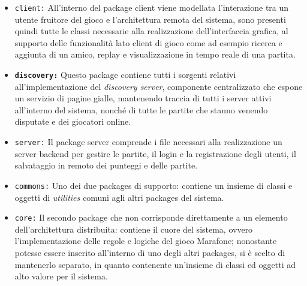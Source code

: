          \begin{itemize}
         \item{\texttt{client:}} All'interno del package client viene modellata l'interazione tra un utente fruitore del gioco e
         l'architettura remota del sistema, sono presenti quindi tutte le classi necessarie alla realizzazione dell'interfaccia grafica, al supporto delle funzionalità lato client di gioco come ad esempio ricerca e aggiunta di un amico, replay e visualizzazione in tempo reale di una partita.


         \item{\textbf{\texttt{discovery:}}}
           Questo package contiene tutti i sorgenti relativi all'implementazione del \textit{discovery server},
           componente centralizzato che espone un servizio di pagine gialle, mantenendo traccia di tutti i server attivi
           all'interno del sistema, nonché di tutte le partite che stanno venendo disputate e dei giocatori online.

         \item{\texttt{server:}}
           Il package server comprende i file necessari alla realizzazione un server backend per gestire le partite,
           il login e la registrazione degli utenti, il salvataggio in remoto dei punteggi e delle partite.

         \item{\texttt{commons:}}
           Uno dei due packages di supporto: contiene un insieme di classi e oggetti di \textit{utilities} comuni agli altri packages del sistema.

         \item{\texttt{core:}}
           Il secondo package che non corrisponde direttamente a un elemento dell'architettura distribuita: contiene il cuore del sistema, ovvero l'implementazione delle regole e logiche del gioco Marafone; nonostante potesse essere inserito all'interno di uno degli altri packages, si è scelto di mantenerlo separato, in quanto contenente un'insieme di classi ed oggetti ad alto valore per il sistema.

       \end{itemize}

